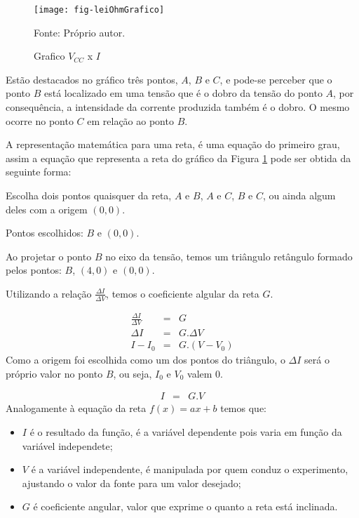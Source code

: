 \begin{figure}[H]
  \centering
  \caption{Grafico $V_{CC}$ x $I$}
  \label{fig:leiOhmGrafico}
  \texttt{[image: fig-leiOhmGrafico]}

  {\small Fonte: Próprio autor.}
\end{figure}

Estão destacados no gráfico três pontos, $A$, $B$ e $C$, e pode-se perceber que o ponto $B$ está localizado em uma tensão que é o dobro da tensão do ponto $A$, por consequência, a intensidade da corrente produzida também é o dobro. O mesmo ocorre no ponto $C$ em relação ao ponto $B$.

A representação matemática para uma reta, é uma equação do primeiro grau, assim a equação que representa a reta do gráfico da Figura \ref{fig:leiOhmGrafico} pode ser obtida da seguinte forma:

Escolha dois pontos quaisquer da reta, $A$ e $B$, $A$ e $C$, $B$ e $C$, ou ainda algum deles com a origem $(0,0)$.

Pontos escolhidos: $B$ e $(0,0)$.

Ao projetar o ponto $B$ no eixo da tensão, temos um triângulo retângulo formado pelos pontos: $B$, $(4,0)$ e $(0,0)$.

Utilizando a relação $\frac{\Delta I}{\Delta V}$, temos o coeficiente algular da reta $G$.

\begin{eqnarray}
  \frac{\Delta I}{\Delta V} & = & G \nonumber \\
  \Delta I & = & G .\Delta V \nonumber \\
  I - I_0 & = & G . (V - V_0)
\end{eqnarray}
Como a origem foi escolhida como um dos pontos do triângulo, o $\Delta I$ será o próprio valor no ponto $B$, ou seja, $I_0$ e $V_0$ valem $0$.

\begin{eqnarray}
  \label{eqn:leiOhmG}
  I & = & G . V
\end{eqnarray}
Analogamente à equação da reta $f(x) = ax + b$ temos que:

\begin{itemize}
  \item $I$ é o resultado da função, é a variável dependente pois varia em função da variável independete;
  \item $V$ é a variável independente, é manipulada por quem conduz o experimento, ajustando o valor da fonte para um valor desejado;
  \item $G$ é coeficiente angular, valor que exprime o quanto a reta está inclinada.
\end{itemize}

